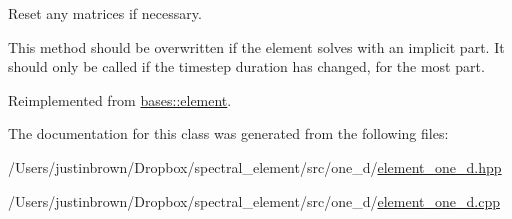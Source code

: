 Reset any matrices if necessary. 



 This method should be overwritten if the element solves with an implicit part. It should only be called if the timestep duration has changed, for the most part. 

Reimplemented from \hyperlink{classbases_1_1element_a0311b32b397accaba0b9066c6c402274}{bases\-::element}.



The documentation for this class was generated from the following files\-:\begin{DoxyCompactItemize}
\item 
/\-Users/justinbrown/\-Dropbox/spectral\-\_\-element/src/one\-\_\-d/\hyperlink{element__one__d_8hpp}{element\-\_\-one\-\_\-d.\-hpp}\item 
/\-Users/justinbrown/\-Dropbox/spectral\-\_\-element/src/one\-\_\-d/\hyperlink{element__one__d_8cpp}{element\-\_\-one\-\_\-d.\-cpp}\end{DoxyCompactItemize}
